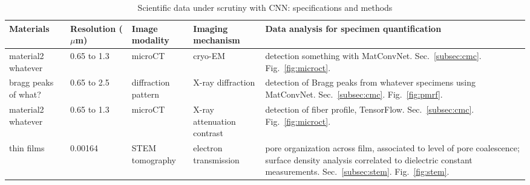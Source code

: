 
\begin{table*}[!]
\centering
\caption{Scientific data under scrutiny with CNN: specifications and methods}
\label{table1}
\begin{tabular}{p{2cm}p{1.6cm}p{1.6cm}p{3cm}p{7.5cm}}
\hline
\rowcolor[HTML]{CCE5FF}
Materials  &  Resolution ($\mu$m)  &  Image \newline modality  &  Imaging  \newline mechanism  &  Data analysis for specimen quantification
\\
\hline
\rowcolor[HTML]{FFFFFF}
material2 \newline whatever & 0.65 to 1.3 & microCT                               & cryo-EM                     & detection something with MatConvNet. Sec.~\ref{subsec:cmc}. Fig.~\ref{fig:microct}.
\\
\hline
\rowcolor[HTML]{F6F6F6}
bragg peaks of what? & 0.65 to 2.5  & diffraction pattern & X-ray diffraction  & detection of Bragg peaks from whatever specimens using MatConvNet. Sec.~\ref{subsec:cmc}. Fig.~\ref{fig:pmrf}.
\\
\hline
\rowcolor[HTML]{FFFFFF}
material2 \newline whatever & 0.65 to 1.3 & microCT  & X-ray attenuation contrast & detection of fiber profile, TensorFlow. Sec.~\ref{subsec:cmc}. Fig.~\ref{fig:microct}.
\\
\hline
\rowcolor[HTML]{F6F6F6}
thin films   & 0.00164  & STEM \newline tomography  & electron transmission    & pore organization across film, associated to level of pore coalescence; surface density analysis correlated to dielectric constant measurements. Sec.~\ref{subsec:stem}. Fig.~\ref{fig:stem}.
\\
\hline
\end{tabular}
\end{table*}
